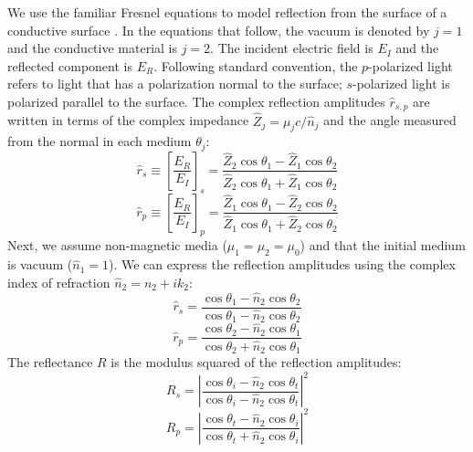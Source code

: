 We use the familiar Fresnel equations to model reflection from the surface of a conductive surface \cite{zangwillModernElectrodynamics2013}. In the equations that follow, the vacuum is denoted by $j=1$ and the conductive material is $j=2$. The incident electric field is $E_I$ and the reflected component is $E_R$. Following standard convention, the $p$-polarized light refers to light that has a polarization normal to the surface; $s$-polarized light is polarized parallel to the surface. The complex reflection amplitudes $\hat{r}_{s,p}$ are written in terms of the complex impedance $\hat{Z}_j = \mu_j c / \hat{n}_j$ and the angle measured from the normal in each medium $\theta_j$:
\begin{equation}
\hat{r}_s \equiv \left[ \frac{E_R}{E_I} \right]_s = \frac{\hat{Z}_2 \cos \theta_1 - \hat{Z}_1 \cos \theta_2}{\hat{Z}_2 \cos \theta_1 + \hat{Z}_1 \cos \theta_2}
\label{eqn:Fresnel_rs_1}
\end{equation}
\begin{equation}
\hat{r}_p \equiv \left[ \frac{E_R}{E_I} \right]_p = \frac{\hat{Z}_1 \cos \theta_1 - \hat{Z}_2 \cos \theta_2}{\hat{Z}_1 \cos \theta_1 + \hat{Z}_2 \cos \theta_2}
\label{eqn:Fresnel_rp_1}
\end{equation}
Next, we assume non-magnetic media ($\mu_1=\mu_2=\mu_0$) and that the initial medium is vacuum ($\hat{n}_1 = 1$). We can express the reflection amplitudes using the complex index of refraction $\hat{n}_2 = n_2 + i k_2$:
\begin{equation}
\hat{r}_s = \frac{ \cos \theta_1 - \hat{n}_2 \cos \theta_2}{ \cos \theta_1 - \hat{n}_2 \cos \theta_2}
\label{eqn:Fresnel_rs_2}
\end{equation}
\begin{equation}
\hat{r}_p = \frac{ \cos \theta_2 - \hat{n}_2 \cos \theta_1}{ \cos \theta_2 + \hat{n}_2 \cos \theta_1}
\label{eqn:Fresnel_rp_2}
\end{equation}
The reflectance $R$ is the modulus squared of the reflection amplitudes:
\begin{equation}
R_s = \left| \frac{ \cos \theta_i - \hat{n}_2 \cos \theta_t}{ \cos \theta_i - \hat{n}_2 \cos \theta_t} \right|^2
\label{eqn:Fresnel_Rs_1}
\end{equation}
\begin{equation}
R_p = \left| \frac{ \cos \theta_t - \hat{n}_2 \cos \theta_i}{ \cos \theta_t + \hat{n}_2 \cos \theta_i} \right|^2
\label{eqn:Fresnel_Rp_1}
\end{equation}
